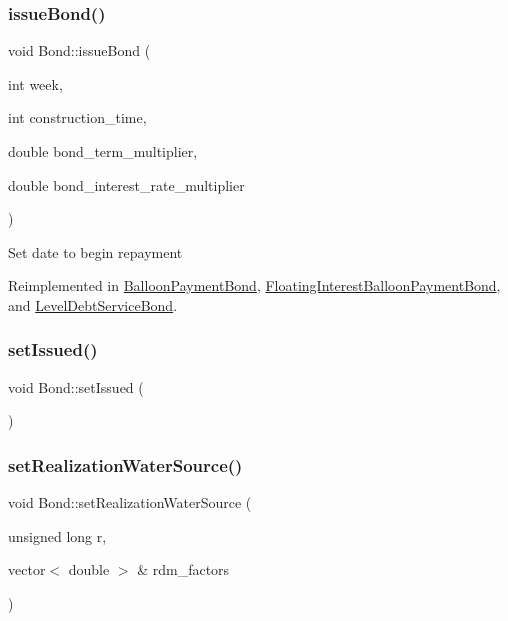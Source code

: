 \subsubsection{\texorpdfstring{issue\+Bond()}{issueBond()}}
{\footnotesize\ttfamily void Bond\+::issue\+Bond (\begin{DoxyParamCaption}\item[{int}]{week,  }\item[{int}]{construction\+\_\+time,  }\item[{double}]{bond\+\_\+term\+\_\+multiplier,  }\item[{double}]{bond\+\_\+interest\+\_\+rate\+\_\+multiplier }\end{DoxyParamCaption})\hspace{0.3cm}{\ttfamily [virtual]}}

Set date to begin repayment 

Reimplemented in \mbox{\hyperlink{classBalloonPaymentBond_af22552acd74b08dbb1d308cc5e45344c_af22552acd74b08dbb1d308cc5e45344c}{Balloon\+Payment\+Bond}}, \mbox{\hyperlink{classFloatingInterestBalloonPaymentBond_a4cf110f320c92f5eca9aed952e0b527a_a4cf110f320c92f5eca9aed952e0b527a}{Floating\+Interest\+Balloon\+Payment\+Bond}}, and \mbox{\hyperlink{classLevelDebtServiceBond_a51a54a1a25be105b168bf86489aee417_a51a54a1a25be105b168bf86489aee417}{Level\+Debt\+Service\+Bond}}.

\mbox{\label{classBond_a573de514b0044cec6a76bb63b098b40a_a573de514b0044cec6a76bb63b098b40a}} 
\subsubsection{\texorpdfstring{set\+Issued()}{setIssued()}}
{\footnotesize\ttfamily void Bond\+::set\+Issued (\begin{DoxyParamCaption}{ }\end{DoxyParamCaption})}

\mbox{\label{classBond_a19fd997eed14b4cb4151063c24a13cdd_a19fd997eed14b4cb4151063c24a13cdd}} 
\subsubsection{\texorpdfstring{set\+Realization\+Water\+Source()}{setRealizationWaterSource()}}
{\footnotesize\ttfamily void Bond\+::set\+Realization\+Water\+Source (\begin{DoxyParamCaption}\item[{unsigned long}]{r,  }\item[{vector$<$ double $>$ \&}]{rdm\+\_\+factors }\end{DoxyParamCaption})\hspace{0.3cm}{\ttfamily [virtual]}}


